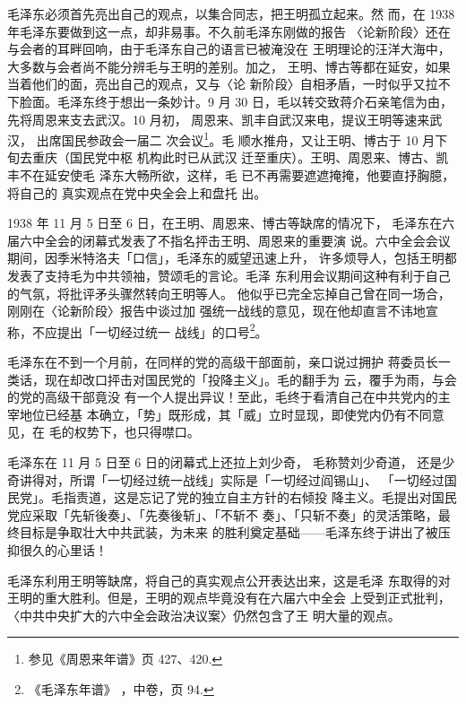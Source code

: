 毛泽东必须首先亮出自己的观点，以集合同志，把王明孤立起来。然 而，在 1938
年毛泽东要做到这一点，却非易事。不久前毛泽东刚做的报告 〈论新阶段〉还在
与会者的耳畔回响，由于毛泽东自己的语言已被淹没在 王明理论的汪洋大海中，
大多数与会者尚不能分辨毛与王明的差别。加之， 王明、博古等都在延安，如果
当着他们的面，亮出自己的观点，又与〈论 新阶段〉自相矛盾，一时似乎又拉不
下脸面。毛泽东终于想出一条妙计。9 月 30 日，毛以转交致蒋介石亲笔信为由，
先将周恩来支去武汉。10 月初， 周恩来、凯丰自武汉来电，提议王明等速来武汉，
出席国民参政会一届二 次会议\footnote{参见《周恩来年谱》页 427、420.}。毛
顺水推舟，又让王明、博古于 10 月下旬去重庆（国民党中枢 机构此时已从武汉
迁至重庆）。王明、周恩来、博古、凯丰不在延安使毛 泽东大畅所欲，这样，毛
已不再需要遮遮掩掩，他要直抒胸臆，将自己的 真实观点在党中央全会上和盘托
出。

1938 年 11 月 5 日至 6 日，在王明、周恩来、博古等缺席的情况下，
毛泽东在六届六中全会的闭幕式发表了不指名抨击王明、周恩来的重要演
说。六中全会会议期间，因季米特洛夫「口信」，毛泽东的威望迅速上升，
许多烦导人，包括王明都发表了支持毛为中共领袖，赞颂毛的言论。毛泽
东利用会议期间这种有利于自己的气氛，将批评矛头骤然转向王明等人。
他似乎已完全忘掉自己曾在同一场合，刚刚在〈论新阶段〉报告中谈过加
强统一战线的意见，现在他却直言不讳地宣称，不应提出「一切经过统一
战线」的口号\footnote{《毛泽东年谱》
，中卷，页 94.}。

毛泽东在不到一个月前，在同样的党的高级干部面前，亲口说过拥护
蒋委员长一类话，现在却改口抨击对国民党的「投降主义」。毛的翻手为
云，覆手为雨，与会的党的高级干部竟没
有一个人提出异议！至此，毛终于看清自己在中共党内的主宰地位已经基
本确立，「势」既形成，其「威」立时显现，即使党内仍有不同意见，在
毛的权势下，也只得噤口。

毛泽东在 11 月 5 日至 6 日的闭幕式上还拉上刘少奇，
毛称赞刘少奇道，
还是少奇讲得对，所谓「一切经过统一战线」实际是「一切经过阎锡山」、
「一切经过国民党」。毛指责道，这是忘记了党的独立自主方针的右倾投
降主义。毛提出对国民党应采取「先斩後奏」、「先奏後斩」、「不斩不
奏」、「只斩不奏」的灵活策略，最终目标是争取壮大中共武装，为未来
的胜利奠定基础——毛泽东终于讲出了被压抑很久的心里话！

毛泽东利用王明等缺席，将自己的真实观点公开表达出来，这是毛泽
东取得的对王明的重大胜利。但是，王明的观点毕竟没有在六届六中全会
上受到正式批判，〈中共中央扩大的六中全会政治决议案〉仍然包含了王
明大量的观点。

